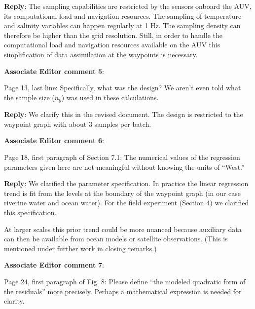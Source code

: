\documentclass[a4paper]{article}
\def\aecom{\textbf{Associate Editor comment }}
\def\reply{\textbf{Reply}}
\begin{document}
\reply: The sampling capabilities are restricted by the sensors onboard the AUV, its computational load and navigation resources. The sampling of temperature and salinity variables can happen regularly at 1 Hz. The sampling density can therefore be higher than the grid resolution. Still, in order to handle the computational load and navigation resources available on the AUV this simplification of data assimilation at the waypoints is necessary. %
\vspace{1em}

\vspace{5mm}
\noindent \aecom \textbf{5}:

Page 13, last line: Specifically, what was the design? We aren’t even told what the sample size ($n_y$) was used in these calculations.\par

\reply: We clarify this in the revised document. The design is restricted to the waypoint graph with about 3 samples per batch.  

\vspace{1em}

\vspace{5mm}
\noindent \aecom \textbf{6}:

Page 18, first paragraph of Section 7.1: The numerical values of the regression parameters given here are not meaningful without knowing the units of “West.”\par

\reply: We clarified the parameter specification.
In practice the linear regression trend is fit from the levels at the boundary of the waypoint graph (in our case riverine water and ocean water). For the field experiment (Section 4) we clarified this specification.

At larger scales this prior trend could be more nuanced because auxiliary data can then be available from ocean models or satellite observations. (This is mentioned under further work in closing remarks.)

\vspace{1em}

\vspace{5mm}
\noindent \aecom \textbf{7}:

Page 24, first paragraph of Fig. 8: Please define “the modeled quadratic form of the residuals” more precisely. Perhaps a mathematical expression is needed for clarity.\par
\end{document}
